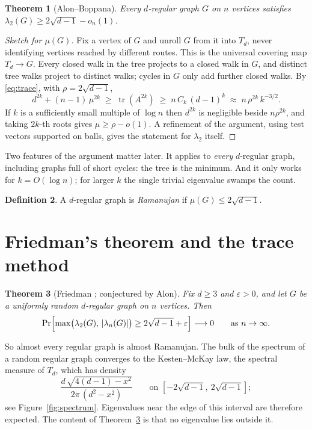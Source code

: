 \documentclass[11pt,letterpaper]{article}
\newtheorem{theorem}{Theorem}
\theoremstyle{definition}
\newtheorem{definition}[theorem]{Definition}
\theoremstyle{remark}
\DeclareMathOperator{\tr}{tr}
\newcommand{\edge}{2\sqrt{d-1}}
\newcommand{\eps}{\varepsilon}
\begin{document}
\begin{theorem}[Alon--Boppana]\label{thm:ab}
Every $d$-regular graph $G$ on $n$ vertices satisfies $\lambda_2(G)\ge\edge-o_n(1)$.
\end{theorem}

\begin{proof}[Sketch for $\mu(G)$]
Fix a vertex of $G$ and unroll $G$ from it into $T_d$, never identifying vertices reached by
different routes. This is the universal covering map $T_d\to G$. Every closed walk in the tree
projects to a closed walk in $G$, and distinct tree walks project to distinct walks; cycles in
$G$ only add further closed walks. By \eqref{eq:trace}, with $\rho=\edge$,
\[
  d^{2k}+(n-1)\,\mu^{2k}\;\ge\;\tr(A^{2k})\;\ge\;n\,C_k\,(d-1)^k\;\approx\;n\,\rho^{2k}\,k^{-3/2}.
\]
If $k$ is a sufficiently small multiple of $\log n$ then $d^{2k}$ is negligible beside
$n\rho^{2k}$, and taking $2k$-th roots gives $\mu\ge\rho-o(1)$. A refinement of the argument,
using test vectors supported on balls, gives the statement for $\lambda_2$ itself.
\end{proof}

Two features of the argument matter later. It applies to \emph{every} $d$-regular graph, including
graphs full of short cycles: the tree is the minimum. And it only works for $k=O(\log n)$; for
larger $k$ the single trivial eigenvalue swamps the count.

\begin{definition}
A $d$-regular graph is \emph{Ramanujan} if $\mu(G)\le\edge$.
\end{definition}

\section{Friedman's theorem and the trace method}

\begin{theorem}[Friedman \cite{F}; conjectured by Alon]\label{thm:friedman}
Fix $d\ge 3$ and $\eps>0$, and let $G$ be a uniformly random $d$-regular graph on $n$ vertices.
Then
\[
  \Pr\Bigl[\max\bigl(\lambda_2(G),\,|\lambda_n(G)|\bigr)\ge\edge+\eps\Bigr]\longrightarrow 0
  \qquad\text{as } n\to\infty .
\]
\end{theorem}

So almost every regular graph is almost Ramanujan. The bulk of the spectrum of a random regular
graph converges to the Kesten--McKay law, the spectral measure of $T_d$, which has density
\[
  \frac{d\,\sqrt{4(d-1)-x^2}}{2\pi\,(d^2-x^2)}\qquad\text{on } [-\edge,\ \edge];
\]
see Figure~\ref{fig:spectrum}. Eigenvalues near the edge of this interval are therefore expected.
The content of Theorem~\ref{thm:friedman} is that no eigenvalue lies outside it.
\end{document}
